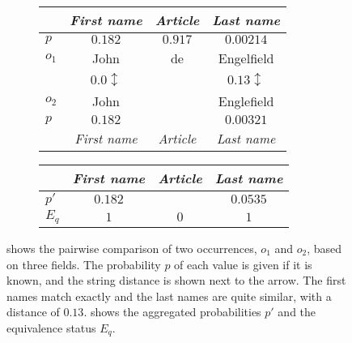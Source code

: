 \begin{figure}
    \centering
    \begin{subfigure}[b]{\linewidth}
        \centering
        \begin{tabular}{| l | c | c | c |}
            \cline{2-4}
            \multicolumn{1}{l|}{ } & \textit{First name} & \textit{Article} & \textit{Last name} \\\hline
            $p$ & $0.182$ & $0.917$ & $0.00214$ \\\hline
            $o_1$ & John & de & Engelfield \\\hline
            \multicolumn{1}{c}{ } & \multicolumn{1}{c}{$0.0 \updownarrow$} & \multicolumn{1}{c}{ } & \multicolumn{1}{c}{$0.13 \updownarrow$} \\\hline
            $o_2$ & John & & Englefield \\\hline
            $p$ & $0.182$ &  & $0.00321$\\\hline
            \multicolumn{1}{l|}{ } & \textit{First name} & \textit{Article} & \textit{Last name}\\\cline{2-4}
        \end{tabular}
        \subcaption{}
        \label{fig:classify1}
    \end{subfigure}
    \par\bigskip
    \begin{subfigure}[b]{\linewidth}
        \centering
        \begin{tabular}{| l | c | c | c |}
            \cline{2-4}
            \multicolumn{1}{l|}{ } & \textit{First name} & \textit{Article} & \textit{Last name} \\\hline
            $p'$ & $0.182$ & & $0.0535$ \\\hline
            $E_q$ & $1$ & $0$ & $1$\\\hline
        \end{tabular}
        \subcaption{}
        \label{fig:classify2}
    \end{subfigure}
    \caption{ shows the pairwise comparison of two occurrences, $o_1$ and $o_2$, based on three fields. The probability $p$ of each value is given if it is known, and the string distance is shown next to the arrow. The first names match exactly and the last names are quite similar, with a distance of $0.13$.  shows the aggregated probabilities $p'$ and the equivalence status $E_q$.}
\end{figure}

